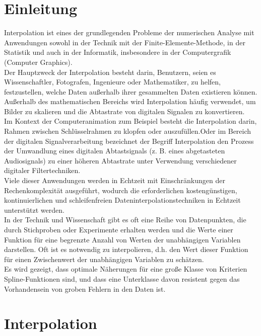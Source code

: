 {		\begin{frame}
			\tableofcontents
		\end{frame}
		
		\mainmatter   
		
		\section{Einleitung}   
		\label{chap:intro} 
		Interpolation ist eines der grundlegenden Probleme der numerischen Analyse mit Anwendungen sowohl in der Technik mit der Finite-Elemente-Methode, in der Statistik und auch in der Informatik, insbesondere in der Computergrafik (Computer Graphics).\\
		Der Hauptzweck der Interpolation besteht darin, Benutzern, seien es Wissenschaftler, Fotografen, Ingenieure oder Mathematiker, zu helfen, festzustellen, welche Daten außerhalb ihrer gesammelten Daten existieren können. Außerhalb des mathematischen Bereichs wird Interpolation häufig verwendet, um Bilder zu skalieren und die Abtastrate von digitalen Signalen zu konvertieren.\\
		Im Kontext der Computeranimation zum Beispiel besteht die Interpolation darin, Rahmen zwischen Schlüsselrahmen zu klopfen oder auszufüllen.Oder im Bereich der digitalen Signalverarbeitung bezeichnet der Begriff Interpolation den Prozess der Umwandlung eines digitalen Abtastsignals (z. B. eines abgetasteten Audiosignals) zu einer höheren Abtastrate unter Verwendung verschiedener digitaler Filtertechniken.\\
		Viele dieser Anwendungen werden in Echtzeit mit Einschränkungen der Rechenkomplexität ausgeführt, wodurch die erforderlichen kostengünstigen, kontinuierlichen und schleifenfreien Dateninterpolationstechniken in Echtzeit unterstützt werden. \\
		In der Technik und Wissenschaft gibt es oft eine Reihe von Datenpunkten, die durch Stichproben oder Experimente erhalten werden und die Werte einer Funktion für eine begrenzte Anzahl von Werten der unabhängigen Variablen darstellen. Oft ist es notwendig zu interpolieren, d.h. den Wert dieser Funktion für einen Zwischenwert der unabhängigen Variablen zu schätzen.\\
		Es wird gezeigt, dass optimale Näherungen für eine große Klasse von Kriterien Spline-Funktionen sind, und dass eine Unterklasse davon resistent gegen das Vorhandensein von groben Fehlern in den Daten ist.
		
		\section{Interpolation }   %
		
}
